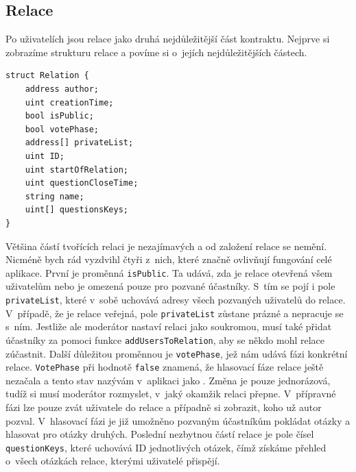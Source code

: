 \subsection{Relace}
Po uživatelích jsou relace jako druhá nejdůležitější část kontraktu. Nejprve si zobrazíme strukturu relace a povíme si o~jejích nejdůležitějších částech. 

\begin{verbatim}
struct Relation {
    address author;
    uint creationTime; 
    bool isPublic; 
    bool votePhase; 
    address[] privateList; 
    uint ID;
    uint startOfRelation; 
    uint questionCloseTime; 
    string name; 
    uint[] questionsKeys;
}
\end{verbatim}

Většina částí tvořících relaci je nezajímavých a od založení relace se nemění. Nicméně bych rád vyzdvihl čtyři z~nich, které značně ovlivňují fungování celé aplikace. První je proměnná \texttt{isPublic}. Ta udává, zda je relace otevřená všem uživatelům nebo je omezená pouze pro pozvané účastníky. S~tím se pojí i pole \texttt{privateList}, které v~sobě uchovává adresy všech pozvaných uživatelů do relace. V~případě, že je relace veřejná, pole \texttt{privateList} zůstane prázné a nepracuje se s~ním. Jestliže ale moderátor nastaví relaci jako soukromou, musí také přidat účastníky za pomoci funkce \texttt{addUsersToRelation}, aby se někdo mohl relace zúčastnit. Další důležitou proměnnou je \texttt{votePhase}, jež nám udává fázi konkrétní relace. \texttt{VotePhase} při hodnotě \texttt{false} znamená, že hlasovací fáze relace ještě nezačala a tento stav nazývám v~aplikaci jako . Změna je pouze jednorázová, tudíž si musí moderátor rozmyslet, v~jaký okamžik relaci přepne. V~přípravné fázi lze pouze zvát uživatele do relace a případně si zobrazit, koho už autor pozval. V~hlasovací fázi je již umožněno pozvaným účastníkům pokládat otázky a hlasovat pro otázky druhých. Poslední nezbytnou částí relace je pole čísel \texttt{questionKeys}, které uchovává ID jednotlivých otázek, čímž získáme přehled o~všech otázkách relace, kterými uživatelé přispějí.
